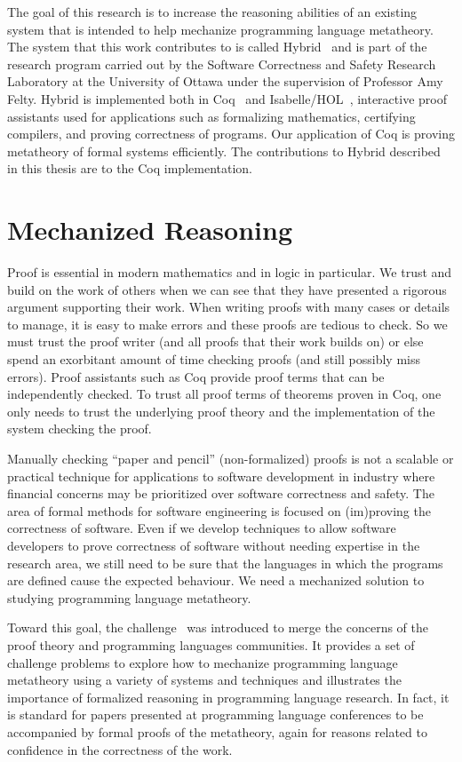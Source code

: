 The goal of this research is to increase the reasoning abilities of an existing system that is intended to help mechanize programming language metatheory. The system that this work contributes to is called Hybrid~\cite{FeltyMomigliano:JAR10} and is part of the research program carried out by the Software Correctness and Safety Research Laboratory at the University of Ottawa under the supervision of Professor Amy Felty. Hybrid is implemented both in Coq~\cite{coq} and Isabelle/HOL~\cite{NPW:2002}, interactive proof assistants used for applications such as formalizing mathematics, certifying compilers, and proving correctness of programs. Our application of Coq is proving metatheory of formal systems efficiently. The contributions to Hybrid described in this thesis are to the Coq implementation.

\section{Mechanized Reasoning}

Proof is essential in modern mathematics and in logic in particular. We trust and build on the work of others when we can see that they have presented a rigorous argument supporting their work. When writing proofs with many cases or details to manage, it is easy to make errors and these proofs are tedious to check. So we must trust the proof writer (and all proofs that their work builds on) or else spend an exorbitant amount of time checking proofs (and still possibly miss errors). Proof assistants such as Coq provide proof terms that can be independently checked. To trust all proof terms of theorems proven in Coq, one only needs to trust the underlying proof theory and the implementation of the system checking the proof.

Manually checking ``paper and pencil'' (non-formalized) proofs is not a scalable or practical technique for applications to software development in industry where financial concerns may be prioritized over software correctness and safety. The area of formal methods for software engineering is focused on (im)proving the correctness of software. Even if we develop techniques to allow software developers to prove correctness of software without needing expertise in the research area, we still need to be sure that the languages in which the programs are defined cause the expected behaviour. We need a mechanized solution to studying programming language metatheory.

Toward this goal, the \poplmark{} challenge~\cite{Aydemir05TPHOLs} was introduced to merge the concerns of the proof theory and programming languages communities. It provides a set of challenge problems to explore how to mechanize programming language metatheory using a variety of systems and techniques and illustrates the importance of formalized reasoning in programming language research. In fact, it is standard for papers presented at programming language conferences to be accompanied by formal proofs of the metatheory, again for reasons related to confidence in the correctness of the work.

